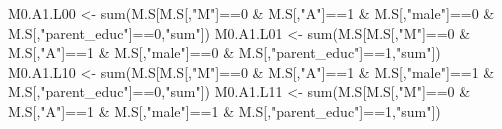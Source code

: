 \documentclass[
]{book}
\newenvironment{Shaded}{\begin{snugshade}}{\end{snugshade}}
\newcommand{\DecValTok}[1]{\textcolor[rgb]{0.00,0.00,0.81}{#1}}
\newcommand{\FunctionTok}[1]{\textcolor[rgb]{0.00,0.00,0.00}{#1}}
\newcommand{\NormalTok}[1]{#1}
\newcommand{\OtherTok}[1]{\textcolor[rgb]{0.56,0.35,0.01}{#1}}
\newcommand{\SpecialCharTok}[1]{\textcolor[rgb]{0.00,0.00,0.00}{#1}}
\newcommand{\StringTok}[1]{\textcolor[rgb]{0.31,0.60,0.02}{#1}}
\begin{document}
\begin{Shaded}
\begin{Highlighting}[]
\NormalTok{  M0.A1.L00 }\OtherTok{\textless{}{-}} \FunctionTok{sum}\NormalTok{(M.S[M.S[,}\StringTok{"M"}\NormalTok{]}\SpecialCharTok{==}\DecValTok{0} \SpecialCharTok{\&}\NormalTok{ M.S[,}\StringTok{"A"}\NormalTok{]}\SpecialCharTok{==}\DecValTok{1} \SpecialCharTok{\&}\NormalTok{ M.S[,}\StringTok{"male"}\NormalTok{]}\SpecialCharTok{==}\DecValTok{0} \SpecialCharTok{\&} 
\NormalTok{                         M.S[,}\StringTok{"parent\_educ"}\NormalTok{]}\SpecialCharTok{==}\DecValTok{0}\NormalTok{,}\StringTok{"sum"}\NormalTok{])}
\NormalTok{  M0.A1.L01 }\OtherTok{\textless{}{-}} \FunctionTok{sum}\NormalTok{(M.S[M.S[,}\StringTok{"M"}\NormalTok{]}\SpecialCharTok{==}\DecValTok{0} \SpecialCharTok{\&}\NormalTok{ M.S[,}\StringTok{"A"}\NormalTok{]}\SpecialCharTok{==}\DecValTok{1} \SpecialCharTok{\&}\NormalTok{ M.S[,}\StringTok{"male"}\NormalTok{]}\SpecialCharTok{==}\DecValTok{0} \SpecialCharTok{\&} 
\NormalTok{                         M.S[,}\StringTok{"parent\_educ"}\NormalTok{]}\SpecialCharTok{==}\DecValTok{1}\NormalTok{,}\StringTok{"sum"}\NormalTok{])}
\NormalTok{  M0.A1.L10 }\OtherTok{\textless{}{-}} \FunctionTok{sum}\NormalTok{(M.S[M.S[,}\StringTok{"M"}\NormalTok{]}\SpecialCharTok{==}\DecValTok{0} \SpecialCharTok{\&}\NormalTok{ M.S[,}\StringTok{"A"}\NormalTok{]}\SpecialCharTok{==}\DecValTok{1} \SpecialCharTok{\&}\NormalTok{ M.S[,}\StringTok{"male"}\NormalTok{]}\SpecialCharTok{==}\DecValTok{1} \SpecialCharTok{\&} 
\NormalTok{                         M.S[,}\StringTok{"parent\_educ"}\NormalTok{]}\SpecialCharTok{==}\DecValTok{0}\NormalTok{,}\StringTok{"sum"}\NormalTok{])}
\NormalTok{  M0.A1.L11 }\OtherTok{\textless{}{-}} \FunctionTok{sum}\NormalTok{(M.S[M.S[,}\StringTok{"M"}\NormalTok{]}\SpecialCharTok{==}\DecValTok{0} \SpecialCharTok{\&}\NormalTok{ M.S[,}\StringTok{"A"}\NormalTok{]}\SpecialCharTok{==}\DecValTok{1} \SpecialCharTok{\&}\NormalTok{ M.S[,}\StringTok{"male"}\NormalTok{]}\SpecialCharTok{==}\DecValTok{1} \SpecialCharTok{\&} 
\NormalTok{                         M.S[,}\StringTok{"parent\_educ"}\NormalTok{]}\SpecialCharTok{==}\DecValTok{1}\NormalTok{,}\StringTok{"sum"}\NormalTok{])}
  

\end{Highlighting}
\end{Shaded}
\end{document}
